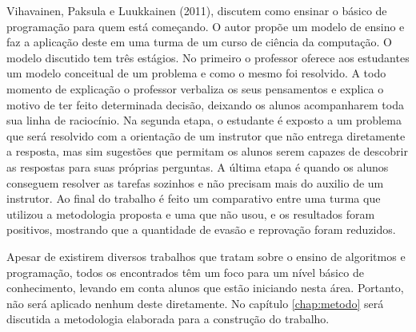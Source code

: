 \nocite{Vihavainen:2011:EAM:1953163.1953196}
Vihavainen, Paksula e Luukkainen (2011), discutem como ensinar o básico de programação para quem está começando. O autor propõe um modelo de ensino e faz a aplicação deste em uma turma de um curso de ciência da computação. O modelo discutido tem três estágios. No primeiro o professor oferece aos estudantes um modelo conceitual de um problema e como o mesmo foi resolvido. A todo momento de explicação o professor verbaliza os seus pensamentos e explica o motivo de ter feito determinada decisão, deixando os alunos acompanharem toda sua linha de raciocínio. Na segunda etapa, o estudante é exposto a um problema que será resolvido com a orientação de um instrutor que não entrega diretamente a resposta, mas sim sugestões que permitam os alunos serem capazes de descobrir as respostas para suas próprias perguntas. A última etapa é quando os alunos conseguem resolver as tarefas sozinhos e não precisam mais do auxilio de um instrutor. Ao final do trabalho é feito um comparativo entre uma turma que utilizou a metodologia proposta e uma que não usou, e os resultados foram positivos, mostrando que a quantidade de evasão e reprovação foram reduzidos.

Apesar de existirem diversos trabalhos que tratam sobre o ensino de algoritmos e programação, todos os encontrados têm um foco para um nível básico de conhecimento, levando em conta alunos que estão iniciando nesta área. Portanto, não será aplicado nenhum deste diretamente. No capítulo \ref{chap:metodo} será discutida a metodologia elaborada para a construção do trabalho.
 




